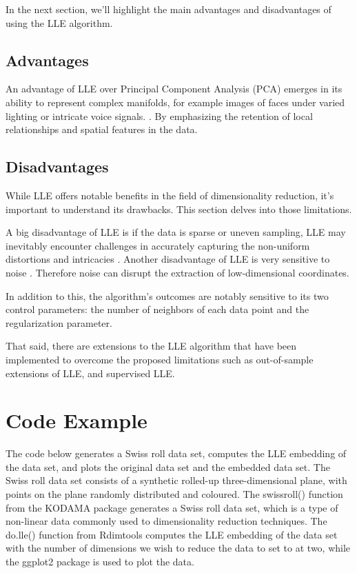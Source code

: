 In the next section, we'll highlight the main advantages and disadvantages of using the LLE algorithm.
\subsection{Advantages}
An advantage of LLE over Principal Component Analysis (PCA) emerges in its ability to represent complex manifolds, for example images of faces under varied lighting or intricate voice signals. \cite{mekuz2005face}. By emphasizing the retention of local relationships and spatial features in the data.


\subsection{Disadvantages}
While LLE offers notable benefits in the field of dimensionality reduction, it's important to understand its drawbacks. This section delves into those limitations.

A big disadvantage of LLE is if the data is sparse or uneven sampling, LLE may inevitably encounter challenges in accurately capturing the non-uniform distortions and intricacies \cite{chen2011locally}.
Another disadvantage of LLE is very sensitive to noise \cite{chen2011locally}. Therefore  noise can disrupt the extraction of low-dimensional coordinates.

In addition to this, the algorithm's outcomes are notably sensitive to its two control parameters: the number of neighbors of each data point and the regularization parameter.

That said, there are extensions to the LLE algorithm that have been implemented to overcome the proposed limitations such as out-of-sample extensions of LLE, and supervised LLE. 

\section{Code Example}
The code below generates a Swiss roll data set, computes the LLE embedding of the data set, and plots the original data set and the embedded data set. The Swiss roll data set consists of a synthetic rolled-up three-dimensional plane, with points on the plane randomly distributed and coloured. The swissroll() function from the KODAMA package generates a Swiss roll data set, which is a type of non-linear data commonly used to dimensionality reduction techniques.  The do.lle() function from Rdimtools computes the LLE embedding of the data set with the number of dimensions we wish to reduce the data to set to at two, while the ggplot2 package is used to plot the data.

